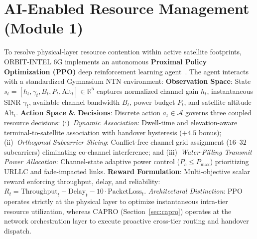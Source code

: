 \documentclass[9pt,a4paper]{article}
\begin{document}
\section{AI-Enabled Resource Management (Module 1)}
To resolve physical-layer resource contention within active satellite footprints, ORBIT-INTEL 6G implements an autonomous \textbf{Proximal Policy Optimization (PPO)} deep reinforcement learning agent~\cite{lin2021jsac}. The agent interacts with a standardized Gymnasium NTN environment:
\textbf{Observation Space}: State $s_t = [h_t, \gamma_t, B_t, P_t, \text{Alt}_t] \in \mathbb{R}^5$ captures normalized channel gain $h_t$, instantaneous SINR $\gamma_t$, available channel bandwidth $B_t$, power budget $P_t$, and satellite altitude $\text{Alt}_t$.
\textbf{Action Space \& Decisions}: Discrete action $a_t \in \mathcal{A}$ governs three coupled resource decisions: (i)~\textit{Dynamic Association}: Dwell-time and elevation-aware terminal-to-satellite association with handover hysteresis ($+4.5$ bonus); (ii)~\textit{Orthogonal Subcarrier Slicing}: Conflict-free channel grid assignment ($16\text{--}32$ subcarriers) eliminating co-channel interference; and (iii)~\textit{Water-Filling Transmit Power Allocation}: Channel-state adaptive power control ($P_c \le P_{\max}$) prioritizing URLLC and fade-impacted links.
\textbf{Reward Formulation}: Multi-objective scalar reward enforcing throughput, delay, and reliability: $R_t = \text{Throughput}_t - \text{Delay}_t - 10 \cdot \text{PacketLoss}_t$.
\textit{Architectural Distinction}: PPO operates strictly at the physical layer to optimize instantaneous intra-tier resource utilization, whereas CAPRO (Section~\ref{sec:capro}) operates at the network orchestration layer to execute proactive cross-tier routing and handover dispatch.
\end{document}
